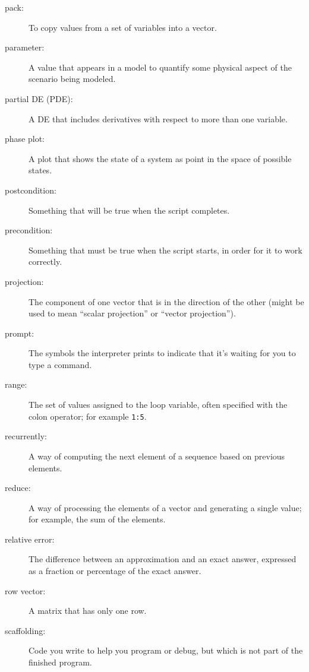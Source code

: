 \begin{description}
\item[pack:] To copy values from a set of variables into a vector.

\item[parameter:] A value that appears in a model to quantify some
physical aspect of the scenario being modeled.

\item[partial DE (PDE):] A DE that includes derivatives with respect to more than one variable.

\item[phase plot:] A plot that shows the state of a system as point
in the space of possible states.

\item[postcondition:] Something that will be true when the script
completes.

\item[precondition:] Something that must be true when the script
starts, in order for it to work correctly.

\item[projection:] The component of one vector that is in the
direction of the other (might be used to mean ``scalar projection'' or
``vector projection'').

\item[prompt:] The symbols the interpreter prints to indicate that it's
waiting for you to type a command.

\item[range:] The set of values assigned to the loop variable, often
specified with the colon operator; for example {\tt 1:5}.

\item[recurrently:] A way of computing the next element of a sequence
based on previous elements.

\item[reduce:] A way of processing the elements of a vector and
generating a single value; for example, the sum of the elements.

\item[relative error:] The difference between an approximation and
an exact answer, expressed as a fraction or percentage of the exact
answer.

\item[row vector:] A matrix that has only one row.

\item[scaffolding:] Code you write to help you program or debug, but
which is not part of the finished program.


\end{description}
